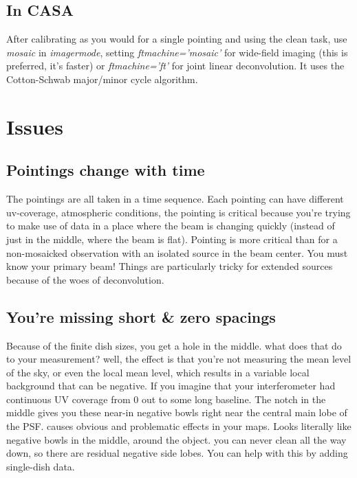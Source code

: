 \documentclass[a4paper]{article}
\begin{document}
\subsection{In CASA}

After calibrating as you would for a single pointing and using the clean task, use \emph{mosaic} in \emph{imagermode}, setting \emph{ftmachine='mosaic'} for wide-field imaging (this is preferred, it's faster) or \emph{ftmachine='ft'} for joint linear deconvolution. It uses the Cotton-Schwab major/minor cycle algorithm. 

\section{Issues}

\subsection{Pointings change with time}

The pointings are all taken in a time sequence. Each pointing can have different uv-coverage, atmospheric conditions, the pointing is critical because you're trying to make use of data in a place where the beam is changing quickly (instead of just in the middle, where the beam is flat). Pointing is more critical than for a non-mosaicked observation with an isolated source in the beam center. You must know your primary beam! Things are particularly tricky for extended sources because of the woes of deconvolution. 

\subsection{You're missing short \& zero spacings}

Because of the finite dish sizes, you get a hole in the middle. what does that do to your measurement? well, the effect is that you're not measuring the mean level of the sky, or even the local mean level, which results in a variable local background that can be negative.
If you imagine that your interferometer had continuous UV coverage from 0 out to some long baseline. The notch in the middle gives you these near-in negative bowls right near the central main lobe of the PSF. causes obvious and problematic effects in your maps. Looks literally like negative bowls in the middle, around the object. you can never clean all the way down, so there are residual negative side lobes. You can help with this by adding single-dish data.
\end{document}
